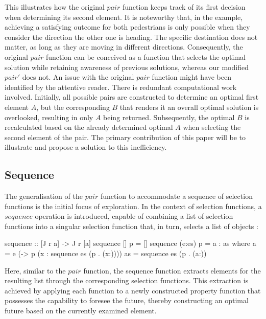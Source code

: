 \documentclass[runningheads]{llncs}
\begin{document}
This illustrates how the original \(pair\) function keeps track of its
first decision when determining its second element. It is noteworthy
that, in the example, achieving a satisfying outcome for both
pedestrians is only possible when they consider the direction the other
one is heading. The specific destination does not matter, as long as
they are moving in different directions. Consequently, the original
\(pair\) function can be conceived as a function that selects the
optimal solution while retaining awareness of previous solutions,
whereas our modified \(pair'\) does not. An issue with the original
\(pair\) function might have been identified by the attentive reader.
There is redundant computational work involved. Initially, all possible
pairs are constructed to determine an optimal first element \(A\), but
the corresponding \(B\) that renders it an overall optimal solution is
overlooked, resulting in only \(A\) being returned. Subsequently, the
optimal \(B\) is recalculated based on the already determined optimal
\(A\) when selecting the second element of the pair. The primary
contribution of this paper will be to illustrate and propose a solution
to this inefficiency.

\subsection{Sequence}\label{sequence}

The generalisation of the \(pair\) function to accommodate a sequence of
selection functions is the initial focus of exploration. In the context
of selection functions, a \(sequence\) operation is introduced, capable
of combining a list of selection functions into a singular selection
function that, in turn, selects a list of objects
\cite{escardo2010sequential}:

\begin{code}
sequence :: [J r a] -> J r [a]
sequence [] p     = []
sequence (e:es) p = a : as
  where 
      a  = e (\x -> p (x : sequence es (p . (x:))))
      as = sequence es (p . (a:))
\end{code}

Here, similar to the \(pair\) function, the sequence function extracts
elements for the resulting list through the corresponding selection
functions. This extraction is achieved by applying each function to a
newly constructed property function that possesses the capability to
foresee the future, thereby constructing an optimal future based on the
currently examined element.
\end{document}
